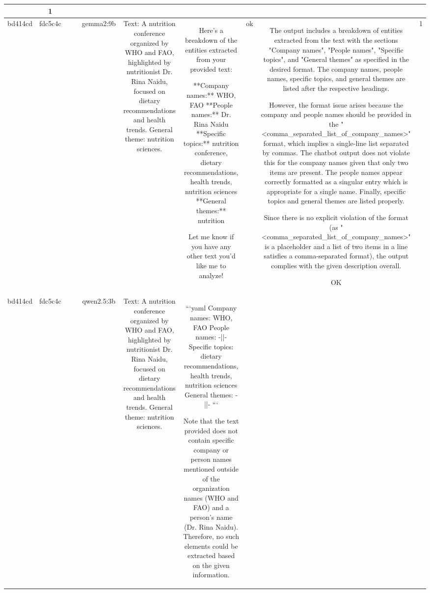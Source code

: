 \begin{table}[h!]
\begin{tabular}{|c|c|c|c|c|c|c|c|c|c|}
{No violation.
OK & 1\\
\hline
bd414cd & fdc5c4c &  &  & gemma2:9b & Text: A nutrition conference organized by WHO and FAO, highlighted by nutritionist Dr. Rina Naidu, focused on dietary recommendations and health trends. General theme: nutrition sciences. & Here's a breakdown of the entities extracted from your provided text:

**Company names:** WHO, FAO 
**People names:** Dr. Rina Naidu
**Specific topics:** nutrition conference, dietary recommendations, health trends, nutrition sciences
**General themes:**  nutrition  


Let me know if you have any other text you'd like me to analyze! 
 & ok & The output includes a breakdown of entities extracted from the text with the sections "Company names", "People names", "Specific topics", and "General themes" as specified in the desired format. The company names, people names, specific topics, and general themes are listed after the respective headings. 

However, the format issue arises because the company and people names should be provided in the "<comma_separated_list_of_company_names>" format, which implies a single-line list separated by commas. The chatbot output does not violate this for the company names given that only two items are present. The people names appear correctly formatted as a singular entry which is appropriate for a single name. Finally, specific topics and general themes are listed properly.

Since there is no explicit violation of the format (as "<comma_separated_list_of_company_names>" is a placeholder and a list of two items in a line satisfies a comma-separated format), the output complies with the given description overall.

OK & 1\\
\hline
bd414cd & fdc5c4c &  &  & qwen2.5:3b & Text: A nutrition conference organized by WHO and FAO, highlighted by nutritionist Dr. Rina Naidu, focused on dietary recommendations and health trends. General theme: nutrition sciences. & ```yaml
Company names: WHO, FAO
People names: -||-
Specific topics: dietary recommendations, health trends, nutrition sciences
General themes: -||-
```

Note that the text provided does not contain specific company or person names mentioned outside of the organization names (WHO and FAO) and a person's name (Dr. Rina Naidu). Therefore, no such elements could be extracted based on the given information.

}
\end{tabular}
\end{table}
